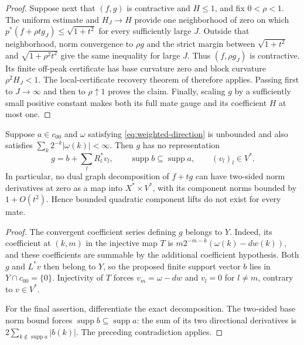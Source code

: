 \documentclass[10pt]{amsart}
\newcommand{\supp}{\operatorname{supp}}
\begin{document}
\begin{proof}
Suppose next that $(f,g)$ is contractive and $H\le1$, and fix
$0<\rho<1$. The uniform estimate and $H_J\to H$ provide one
neighborhood of zero on which
$p^*(f+\rho t g_J)\le\sqrt{1+t^2}$ for every sufficiently
large $J$. Outside that neighborhood, norm convergence to
$\rho g$ and the strict margin between
$\sqrt{1+t^2}$ and $\sqrt{1+\rho^2t^2}$ give the same
inequality for large $J$. Thus $(f,\rho g_J)$ is contractive.
Its finite off-peak certificate has base curvature zero and
block curvature $\rho^2H_J<1$. The local-certificate recovery
theorem of \cite[Theorem~3.1]{Check} therefore applies. Passing first to $J\to\infty$ and
then to $\rho\uparrow1$ proves the claim. Finally, scaling $g$
by a sufficiently small positive constant makes both its full
mate gauge and its coefficient $H$ at most one.
\end{proof}

\begin{proposition}
\label{prop:no-bounded-lift}
Suppose $a\in c_{00}$ and $\omega$ satisfying
\eqref{eq:weighted-direction} is unbounded and also satisfies
$\sum_k2^{-k}|\omega(k)|<\infty$. Then $g$ has no
representation
\[
 g=b+\sum_lR_l^*v_l,
 \qquad \supp b\subseteq\supp a,\qquad
 (v_l)_l\in V^*.
\]
In particular, no dual graph decomposition of $f+tg$ can have
two-sided norm derivatives at zero as a map into
$X^*\times V^*$, with its component norms bounded by
$1+O(t^2)$. Hence bounded quadratic component lifts do
not exist for every mate.
\end{proposition}
\begin{proof}
The convergent coefficient series defining $g$ belongs to $Y$.
Indeed, its coefficient at $(k,m)$ in the injective map $T$ is
$m2^{-m-k}(\omega(k)-dw(k))$, and these coefficients are
summable by the additional coefficient hypothesis.
Both $g$ and $L^*v$ then belong to $Y$, so the proposed finite
support vector $b$ lies in $Y\cap c_{00}=\{0\}$. Injectivity
of $T$ forces $v_m=\omega-dw$ and $v_l=0$ for $l\ne m$,
contrary to $v\in V^*$.

For the final assertion, differentiate the exact decomposition.
The two-sided base norm bound forces
$\supp b\subseteq\supp a$: the sum of its two directional
derivatives is $2\sum_{k\notin\supp a}|b(k)|$. The preceding
contradiction applies.
\end{proof}
\end{document}
